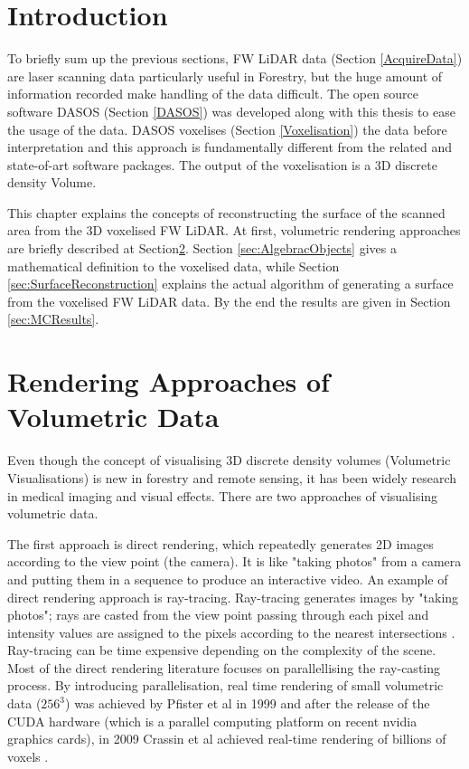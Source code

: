 \documentclass{subfiles}
\begin{document}
	

\section{Introduction}


\par To briefly sum up the previous sections, FW LiDAR data (Section \ref{AcquireData}) are laser scanning data particularly useful in Forestry, but the huge amount of information recorded make handling of the data difficult. The open source software DASOS (Section \ref{DASOS}) was developed along with this thesis to ease the usage of the data. DASOS voxelises (Section \ref{Voxelisation}) the data before interpretation and this approach is fundamentally different from the related and state-of-art software packages. The output of the voxelisation is a 3D discrete density Volume. 


\par This chapter explains the concepts of reconstructing the surface of the scanned area from the 3D voxelised FW LiDAR. At first, volumetric rendering approaches are briefly described at Section\ref{sec:RenderingApproaches}. Section \ref{sec:AlgebracObjects} gives a mathematical definition to the voxelised data, while Section \ref{sec:SurfaceReconstruction} explains the actual algorithm of generating a surface from the voxelised FW LiDAR data. By the end the results are given in Section \ref{sec:MCResults}. 


\section{Rendering Approaches of Volumetric Data}\label{sec:RenderingApproaches}
\par Even though the concept of visualising 3D discrete density volumes (Volumetric Visualisations) is new in forestry and remote sensing, it has been widely research in medical imaging and visual effects. There are two approaches of visualising volumetric data.

\par The first approach is direct rendering, which repeatedly generates 2D images according to the view point (the camera). It is like "taking photos" from a camera and putting them in a sequence to produce an interactive video. An example of direct rendering approach is ray-tracing. Ray-tracing generates images by "taking photos"; rays are casted from the view point passing through each pixel and intensity values are assigned to the pixels according to the nearest intersections \cite{Hanrahan1983}. Ray-tracing can be time expensive depending on the complexity of the scene. Most of the direct rendering literature focuses on parallellising the ray-casting process. By introducing parallelisation, real time rendering of small volumetric data ($256^3$) was achieved by Pfister et al in 1999 \cite{Pfister1999} and after the release of the CUDA hardware (which is a parallel computing platform on recent nvidia graphics cards), in 2009 Crassin et al achieved real-time rendering of billions of voxels \cite{Crassin2009}. 
	
\end{document}
